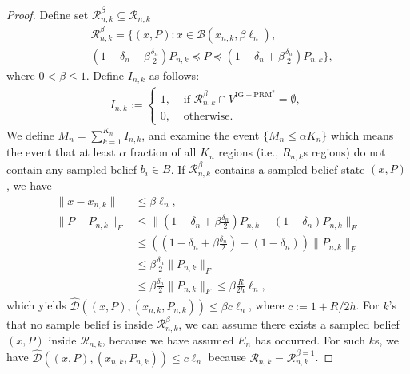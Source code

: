 \documentclass[Afour,sageh,times]{sagej}
\begin{document}
\begin{proof}
Define set $\mathcal{R}^{\beta}_{n,k}\subseteq \mathcal{R}_{n,k} $ 
\begin{align} \nonumber
    &\mathcal{R}^{\beta }_{n,k}=\Biggl\{(x,P): x\in\mathcal{B}\left(x_{n,k},\beta \ell_n\right),\\ \nonumber
    &{\left(1-\delta_n-\beta \frac{\delta_n}{2}\right)}P_{n,k}\preceq P \preceq  \left(1-\delta_n+\beta \frac{\delta_n}{2}\right) P_{n,k}\Biggl\},
\end{align}
where $0<\beta\leq1$. 
Define $I_{n,k}$ as follows:
\begin{align}
    I_{n, k}:= \begin{cases}1, & \text { if }\mathcal{R}^{\beta}_{n,k} \cap V^{\mathrm{IG-PRM}^{*}}=\emptyset, \\ 0, & \text { otherwise. }\end{cases}
\end{align}
We define $M_n=\sum_{k=1}^{K_n} I_{n,k}$, and examine the event $\{M_n\leq \alpha K_n\}$ which means the event that at least $\alpha$ fraction of all $K_n$ regions (i.e., $R_{n,k}$s regions)  do not contain any sampled belief $b_i \in B$. If 
$\mathcal{R}^{\beta}_{n,k}$ contains
a sampled belief state $(x,P)$, we have \begin{align*}
     \|x-x_{n,k}\| & \leq \beta \ell_n,  \\
    \|P-P_{n,k}\|_F &\leq  \|(1-\delta_n + \beta \frac{\delta_n}{2})  P_{n,k}- (1-\delta_n)P_{n,k}\|_F \\
    &\leq \left((1-\delta_n + \beta \frac{\delta_n}{2})- (1-\delta_n) \right) \|P_{n,k}\|_F\\
    & \leq \beta \frac{\delta_n}{2}  \|P_{n,k}\|_F \\
    & \leq \beta\frac{\delta_n}{2} \|P_{n,k}\|_F \leq \beta \frac{ R}{2h} \ell_n ,
\end{align*}
which yields $\hat{\mathcal{D}}((x,P), (x_{n,k},P_{n,k})) \leq  \beta c \ell_n$, where $c:= 1+R/2h$. For $k$'s that no sample belief is inside $\mathcal{R}^{\beta}_{n,k}$, we can assume there exists a sampled belief $(x,P)$ inside $\mathcal{R}_{n,k}$, because we have assumed $E_n$ has occurred. For such $k$s, we have $\hat{\mathcal{D}}((x,P), (x_{n,k},P_{n,k})) \leq  c \ell_n$ because $ \mathcal{R}_{n,k}= \mathcal{R}^{\beta=1}_{n,k}$.

\end{proof}
\end{document}
